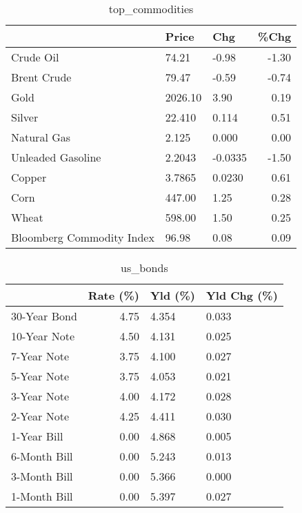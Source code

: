\documentclass{article}%
\begin{document}
\begin{table}[htbp]%
\caption{top\_commodities}%
\centering%
\begin{adjustbox}{width=1\textwidth}%
\begin{tabular}{lllr}
\toprule
                          &   Price &     Chg &  \%Chg \\
\midrule
               Crude Oil  &   74.21 &   -0.98 & -1.30 \\
             Brent Crude  &   79.47 &   -0.59 & -0.74 \\
                    Gold  & 2026.10 &    3.90 &  0.19 \\
                  Silver  &  22.410 &   0.114 &  0.51 \\
             Natural Gas  &   2.125 &   0.000 &  0.00 \\
       Unleaded Gasoline  &  2.2043 & -0.0335 & -1.50 \\
                  Copper  &  3.7865 &  0.0230 &  0.61 \\
                    Corn  &  447.00 &    1.25 &  0.28 \\
                   Wheat  &  598.00 &    1.50 &  0.25 \\
Bloomberg Commodity Index &   96.98 &    0.08 &  0.09 \\
\bottomrule
\end{tabular}
%
\end{adjustbox}%
\end{table}

%


\begin{table}[htbp]%
\caption{us\_bonds}%
\centering%
\begin{adjustbox}{width=1\textwidth}%
\begin{tabular}{lrll}
\toprule
             &  Rate (\%) & Yld (\%) & Yld Chg (\%) \\
\midrule
30-Year Bond &      4.75 &   4.354 &       0.033 \\
10-Year Note &      4.50 &   4.131 &       0.025 \\
 7-Year Note &      3.75 &   4.100 &       0.027 \\
 5-Year Note &      3.75 &   4.053 &       0.021 \\
 3-Year Note &      4.00 &   4.172 &       0.028 \\
 2-Year Note &      4.25 &   4.411 &       0.030 \\
 1-Year Bill &      0.00 &   4.868 &       0.005 \\
6-Month Bill &      0.00 &   5.243 &       0.013 \\
3-Month Bill &      0.00 &   5.366 &       0.000 \\
1-Month Bill &      0.00 &   5.397 &       0.027 \\
\bottomrule
\end{tabular}
%
\end{adjustbox}%
\end{table}
\end{document}
